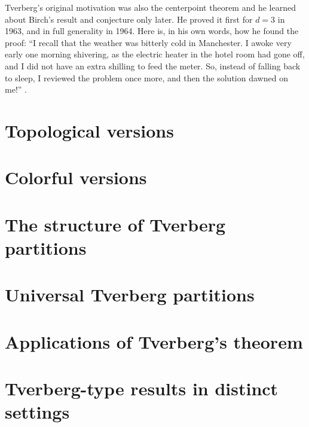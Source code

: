 \documentclass[11pt]{article}
\begin{document}
Tverberg's original motivation was also the centerpoint theorem and he learned about Birch's result and conjecture only later. He proved it first for $d=3$ in 1963, and in full generality in 1964.  Here is, in his own words, how he found the proof:  ``I recall that the weather was bitterly cold in Manchester. I awoke very early one morning shivering, as the electric heater in the hotel room had gone off, and I did not have an extra shilling to feed the meter. So, instead of falling back to sleep, I reviewed the problem once more, and then the solution dawned on me!'' \cite{tve:recollections}.

\section{Topological versions}\label{section-topological}

\section{Colorful versions}\label{section-colored}

\section{The structure of Tverberg partitions}\label{section-intersection}

\section{Universal Tverberg partitions}\label{section-universal}

\section{Applications of Tverberg's theorem}\label{section-applications}

\section{Tverberg-type results in distinct settings}\label{section-spaces}


\end{document}
